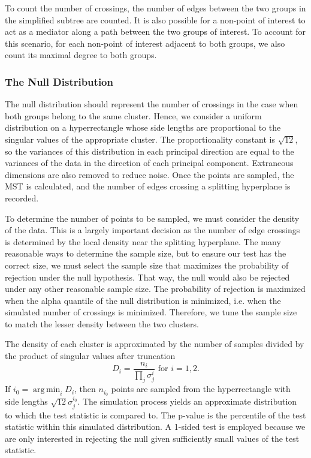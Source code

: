 \documentclass{article}
\DeclareMathOperator*{\argmin}{arg\,min}
\begin{document}
To count the number of crossings, the number of edges between the two groups in the simplified subtree are counted. It is also possible for a non-point of interest to act as a mediator along a path between the two groups of interest. To account for this scenario, for each non-point of interest adjacent to both groups, we also count its maximal degree to both groups.

\subsubsection{The Null Distribution}
The null distribution should represent the number of crossings in the case when both groups belong to the same cluster. Hence, we consider a uniform distribution on a hyperrectangle whose side lengths are proportional to the singular values of the appropriate cluster. The proportionality constant is $\sqrt{12}$, so the variances of this distribution in each principal direction are equal to the variances of the data in the direction of each principal component. Extraneous dimensions are also removed to reduce noise. Once the points are sampled, the MST is calculated, and the number of edges crossing a splitting hyperplane is recorded.

To determine the number of points to be sampled, we must consider the density of the data. This is a largely important decision as the number of edge crossings is determined by the local density near the splitting hyperplane. The many reasonable ways to determine the sample size, but to ensure our test has the correct size, we must select the sample size that maximizes the probability of rejection under the null hypothesis. That way, the null would also be rejected under any other reasonable sample size. The probability of rejection is maximized when the alpha quantile of the null distribution is minimized, i.e. when the simulated number of crossings is minimized. Therefore, we tune the sample size to match the lesser density between the two clusters.

The density of each cluster is approximated by the number of samples divided by the product of singular values after truncation $$D_i = \frac{n_i}{\prod_j \sigma_j^i} \textrm{ for } i=1,2.$$ If $i_0 = \argmin_i D_i$, then $n_{i_0}$ points are sampled from the hyperrectangle with side lengths $\sqrt{12}\sigma_j^{i_0}$. The simulation process yields an approximate distribution to which the test statistic is compared to. The p-value is the percentile of the test statistic within this simulated distribution. A 1-sided test is employed because we are only interested in rejecting the null given sufficiently small values of the test statistic.
\end{document}
